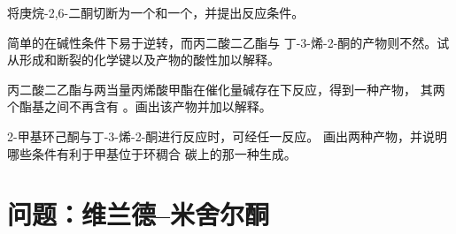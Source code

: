 \begin{exercise}[$\star\star$]\label{exo:b2:conjugate-additions:9}
将庚烷-2,6-二酮切断为一个和一个，并提出反应条件。
\end{exercise}

\begin{exercise}[$\star\star\star$]\label{exo:b2:conjugate-additions:10}
简单的在碱性条件下易于逆转，而丙二酸二乙酯与
丁-3-烯-2-酮的产物则不然。试从形成和断裂的化学键以及产物的酸性加以解释。
\end{exercise}

\begin{exercise}[$\star\star\star$]\label{exo:b2:conjugate-additions:11}
丙二酸二乙酯与两当量丙烯酸甲酯在催化量碱存在下反应，得到一种产物，
其两个酯基之间不再含有 。画出该产物并加以解释。
\end{exercise}

\begin{exercise}[$\star\star\star$]\label{exo:b2:conjugate-additions:12}
2-甲基环己酮与丁-3-烯-2-酮进行反应时，可经任一反应。
画出两种产物，并说明哪些条件有利于甲基位于环稠合
碳上的那一种生成。
\end{exercise}

\section{问题：维兰德–米舍尔酮}

